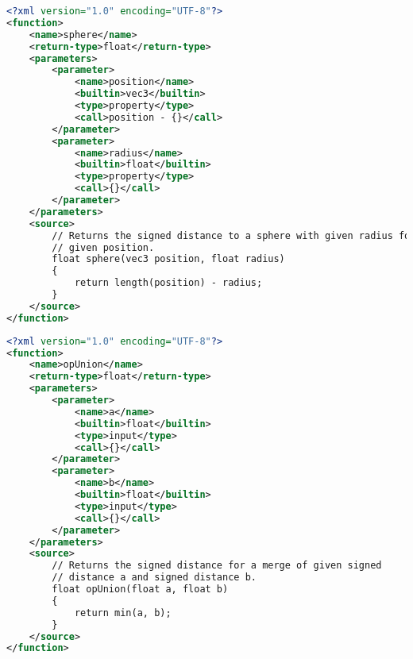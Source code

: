 \begin{minipage}{\linewidth}
\begin{lstlisting}[language=XML,caption={Objekt-Definition einer Kugel
        in XML.},label={listing:prototype:objects:sphere},captionpos=b,emph={xmlns,version,type}]
<?xml version="1.0" encoding="UTF-8"?>
<function>
    <name>sphere</name>
    <return-type>float</return-type>
    <parameters>
        <parameter>
            <name>position</name>
            <builtin>vec3</builtin>
            <type>property</type>
            <call>position - {}</call>
        </parameter>
        <parameter>
            <name>radius</name>
            <builtin>float</builtin>
            <type>property</type>
            <call>{}</call>
        </parameter>
    </parameters>
    <source>
        // Returns the signed distance to a sphere with given radius for the
        // given position.
        float sphere(vec3 position, float radius)
        {
            return length(position) - radius;
        }
    </source>
</function>
\end{lstlisting}
\end{minipage}

\begin{minipage}{\linewidth}
\begin{lstlisting}[language=XML,caption={Definition des Vereinigungs-Operators
        in XML.},label={listing:prototype:operations:union},captionpos=b,emph={castRay}]
<?xml version="1.0" encoding="UTF-8"?>
<function>
    <name>opUnion</name>
    <return-type>float</return-type>
    <parameters>
        <parameter>
            <name>a</name>
            <builtin>float</builtin>
            <type>input</type>
            <call>{}</call>
        </parameter>
        <parameter>
            <name>b</name>
            <builtin>float</builtin>
            <type>input</type>
            <call>{}</call>
        </parameter>
    </parameters>
    <source>
        // Returns the signed distance for a merge of given signed
        // distance a and signed distance b.
        float opUnion(float a, float b)
        {
            return min(a, b);
        }
    </source>
</function>
\end{lstlisting}
\end{minipage}






